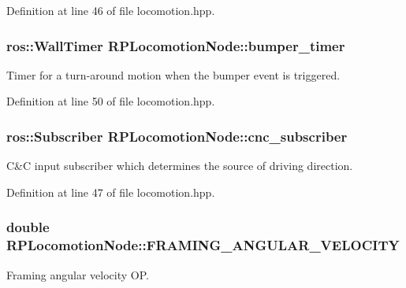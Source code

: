 \-Definition at line 46 of file locomotion.\-hpp.

\hypertarget{class_r_p_locomotion_node_ae8be6c08928b529659031829fb1f9d31}{
\subsubsection[{bumper\-\_\-timer}]{\setlength{\rightskip}{0pt plus 5cm}ros\-::\-Wall\-Timer {\bf \-R\-P\-Locomotion\-Node\-::bumper\-\_\-timer}}}\label{class_r_p_locomotion_node_ae8be6c08928b529659031829fb1f9d31}
\-Timer for a turn-\/around motion when the bumper event is triggered. 

\-Definition at line 50 of file locomotion.\-hpp.

\hypertarget{class_r_p_locomotion_node_a90e0e6121d6eddacb4c7a4598f29b331}{
\subsubsection[{cnc\-\_\-subscriber}]{\setlength{\rightskip}{0pt plus 5cm}ros\-::\-Subscriber {\bf \-R\-P\-Locomotion\-Node\-::cnc\-\_\-subscriber}}}\label{class_r_p_locomotion_node_a90e0e6121d6eddacb4c7a4598f29b331}
\-C\&\-C input subscriber which determines the source of driving direction. 

\-Definition at line 47 of file locomotion.\-hpp.

\hypertarget{class_r_p_locomotion_node_aeed6c095a09f0e720615d21c247a7091}{
\subsubsection[{\-F\-R\-A\-M\-I\-N\-G\-\_\-\-A\-N\-G\-U\-L\-A\-R\-\_\-\-V\-E\-L\-O\-C\-I\-T\-Y}]{\setlength{\rightskip}{0pt plus 5cm}double {\bf \-R\-P\-Locomotion\-Node\-::\-F\-R\-A\-M\-I\-N\-G\-\_\-\-A\-N\-G\-U\-L\-A\-R\-\_\-\-V\-E\-L\-O\-C\-I\-T\-Y}}}\label{class_r_p_locomotion_node_aeed6c095a09f0e720615d21c247a7091}
\-Framing angular velocity \-O\-P. 

